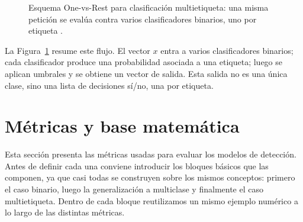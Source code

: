 \documentclass[12pt,oneside]{report}
\begin{document}
\begin{figure}[H]
\centering
{}
\caption{Esquema One-vs-Rest para clasificación multietiqueta: una misma petición se evalúa contra varios clasificadores binarios, uno por etiqueta \cite{tsoumakas_multilabel_overview,rifkin_ova}.}
\label{fig:ovr}
\end{figure}

La Figura~\ref{fig:ovr} resume este flujo. El vector $x$ entra a varios clasificadores binarios; cada clasificador produce una probabilidad asociada a una etiqueta; luego se aplican umbrales y se obtiene un vector de salida. Esta salida no es una única clase, sino una lista de decisiones sí/no, una por etiqueta.

\section{Métricas y base matemática}

Esta sección presenta las métricas usadas para evaluar los modelos de
detección. Antes de definir cada una conviene introducir los bloques
básicos que las componen, ya que casi todas se construyen sobre los
mismos conceptos: primero el caso binario, luego la generalización a
multiclase y finalmente el caso multietiqueta. Dentro de cada bloque reutilizamos un mismo ejemplo numérico
a lo largo de las distintas métricas.
\end{document}
